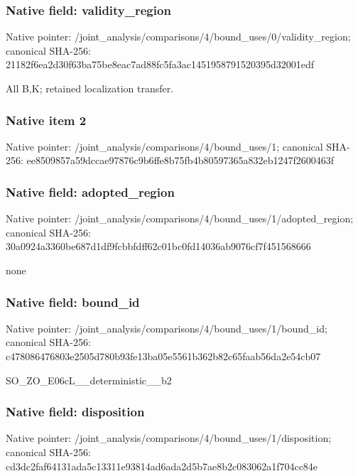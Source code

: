 \documentclass[10pt,a4paper]{article}
\begin{document}
\subsubsection{Native field: validity\_region}


Native pointer: /joint\_analysis/comparis\allowbreak{}ons/4/bound\_uses/0/valid\allowbreak{}ity\_region; canonical SHA-256: 21182f6ea2d30f63ba75be8e\allowbreak{}ac7ad88fc5fa3ac145195879\allowbreak{}1520395d32001edf


All B,K; retained localization transfer.


\subsubsection{Native item 2}


Native pointer: /joint\_analysis/comparis\allowbreak{}ons/4/bound\_uses/1; canonical SHA-256: ee8509857a59dccae97876c9\allowbreak{}b6ffe8b75fb4b80597365a83\allowbreak{}2eb1247f2600463f



\subsubsection{Native field: adopted\_region}


Native pointer: /joint\_analysis/comparis\allowbreak{}ons/4/bound\_uses/1/adopt\allowbreak{}ed\_region; canonical SHA-256: 30a0924a3360be687d1df9fc\allowbreak{}bbfdff62c01bc0fd14036ab9\allowbreak{}076cf7f451568666


none


\subsubsection{Native field: bound\_id}


Native pointer: /joint\_analysis/comparis\allowbreak{}ons/4/bound\_uses/1/bound\allowbreak{}\_id; canonical SHA-256: c478086476803e2505d780b9\allowbreak{}3fe13ba05e5561b362b82c65\allowbreak{}faab56da2e54cb07


SO\_ZO\_E06cL\_\_deterministic\_\_b2


\subsubsection{Native field: disposition}


Native pointer: /joint\_analysis/comparis\allowbreak{}ons/4/bound\_uses/1/dispo\allowbreak{}sition; canonical SHA-256: cd3dc2faf64131ada5c13311\allowbreak{}e93814ad6ada2d5b7ae8b2c0\allowbreak{}83062a1f704cc84e
\end{document}
